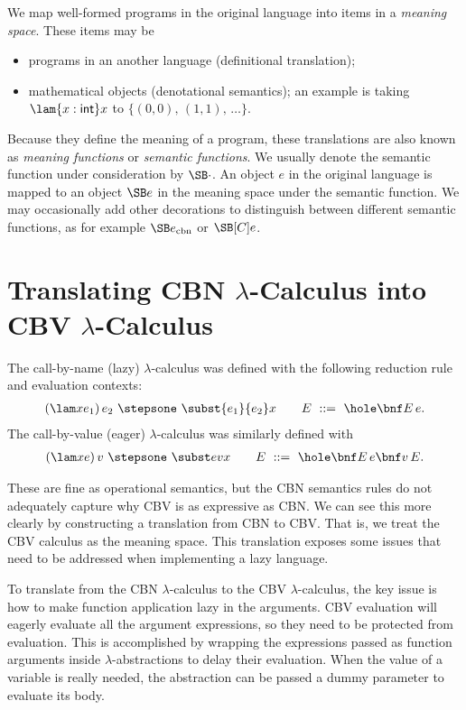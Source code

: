We map well-formed programs in the original language into items in
a \emph{meaning space}. These items may be

\begin{itemize}
\item programs in an another language (definitional translation);
\item mathematical objects (denotational semantics); an example is taking $\lam{x:\mathsf{int}}x$ to $\{(0,0),\,(1,1),\,\ldots\}$.
\end{itemize}

Because they define the meaning of a program, these translations are
also known as \emph{meaning functions} or \emph{semantic functions}. We
usually denote the semantic function under consideration by $\SB\cdot$.
An object $e$ in the original language is mapped to an object $\SB e$ in
the meaning space under the semantic function. We may occasionally add
other decorations to distinguish between different semantic functions, as
for example $\SB e_{\mathrm{cbn}}$ or $\SB[C]e$.

\section{Translating CBN $\lambda$-Calculus into CBV $\lambda$-Calculus}

The call-by-name (lazy) $\lambda$-calculus was defined with the
following reduction rule and evaluation contexts:
\begin{eqnarray*}
(\lam x{e_1})\,e_2\ \stepsone\ \subst{e_1}{e_2}x
&\quad&
E\ ::=\ \hole \bnf E\,e.
\end{eqnarray*}
The call-by-value (eager) $\lambda$-calculus was similarly defined with
\begin{eqnarray*}
(\lam xe)\,v\ \stepsone\ \subst evx
&\quad&
E\ ::=\ \hole \bnf E\,e \bnf v\,E.
\end{eqnarray*}

These are fine as operational semantics, but the CBN semantics rules
do not adequately capture why CBV is as expressive as CBN.
We can see this more clearly by constructing a translation from CBN to CBV.
That is, we treat the CBV calculus as the meaning space.
This translation exposes some issues that need to be addressed when
implementing a lazy language.

To translate from the CBN $\lambda$-calculus to the CBV $\lambda$-calculus,
the key issue is how to make function application lazy in the arguments.
CBV evaluation will eagerly evaluate all the argument expressions, so
they need to be protected from evaluation. This is accomplished by
wrapping the expressions passed as function arguments inside
$\lambda$-abstractions to delay their evaluation. When the value of a
variable is really needed, the abstraction can be passed a dummy parameter
to evaluate its body.

